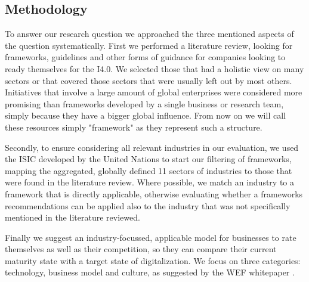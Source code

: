






\subsection{Methodology}

To answer our research question we approached the three mentioned aspects of the question systematically. First we performed a literature review, looking for frameworks, guidelines and other forms of guidance for companies looking to ready themselves for the \ac{I4.0}. We selected those that had a holistic view on many sectors or that covered those sectors that were usually left out by most others. Initiatives that involve a large amount of global enterprises were considered more promising than frameworks developed by a single business or research team, simply because they have a bigger global influence. From now on we will call these resources simply "framework" as they represent such a structure.

Secondly, to ensure considering all relevant industries in our evaluation, we used the \ac{ISIC} developed by the United Nations to start our filtering of frameworks, mapping the aggregated, globally defined 11 sectors of industries \cite{ISIC:2008} to those that were found in the literature review. Where possible, we match an industry to a framework that is directly applicable, otherwise evaluating whether a frameworks recommendations can be applied also to the industry that was not specifically mentioned in the literature reviewed. 

Finally we suggest an industry-focussed, applicable model for businesses to rate themselves as well as their competition, so they can compare their current maturity state with a target state of digitalization. We focus on three categories: technology, business model and culture, as suggested by the \ac{WEF} whitepaper \cite{worldforumdigitalenterprise:2016}.


